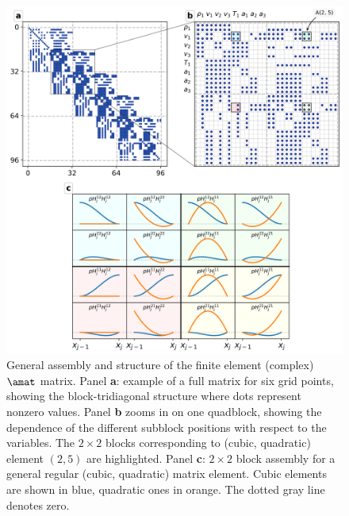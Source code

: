 \begin{figure}[t!]
  \centering
  \includegraphics[width=\textwidth]{matrix_assembly.png}
  \caption{
    General assembly and structure of the finite element (complex) $\amat$ matrix. Panel \textbf{a}: example of a full matrix for six grid points, showing the block-tridiagonal structure where dots represent nonzero values. Panel \textbf{b} zooms in on one quadblock, showing the dependence of the different subblock positions with respect to the variables. The $2 \times 2$ blocks corresponding to (cubic, quadratic) element $(2, 5)$ are highlighted.
    Panel \textbf{c}: $2 \times 2$ block assembly for a general regular (cubic, quadratic) matrix element. Cubic elements are shown in blue, quadratic ones in orange. The dotted gray line denotes zero.
  }
  \label{fig: matrix_assembly}
\end{figure}

